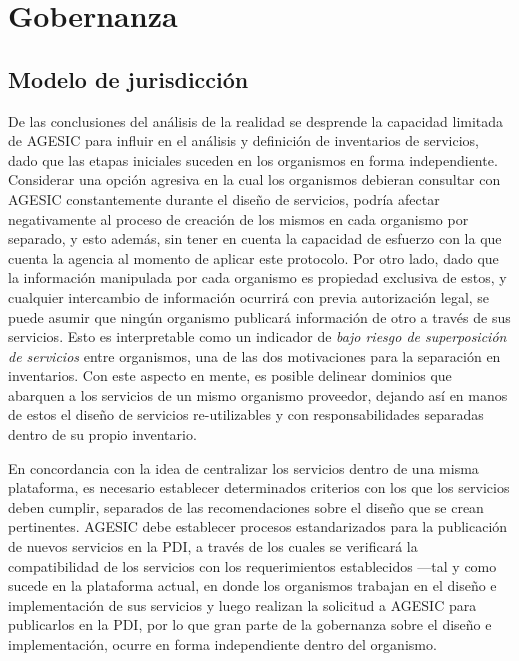 \section{Gobernanza}
  \label{Solucion:Gobernanza}

  \subsection{Modelo de jurisdicción}
    \label{Solucion:Gobernanza:ModeloJurisdiccion}
    De las conclusiones del análisis de la realidad se desprende la capacidad limitada de AGESIC para influir en el análisis y definición de inventarios de servicios, dado que las etapas iniciales suceden en los organismos en forma independiente. Considerar una opción agresiva en la cual los organismos debieran consultar con AGESIC constantemente durante el diseño de servicios, podría afectar negativamente al proceso de creación de los mismos en cada organismo por separado, y esto además, sin tener en cuenta la capacidad de esfuerzo con la que cuenta la agencia al momento de aplicar este protocolo. Por otro lado, dado que la información manipulada por cada organismo es propiedad exclusiva de estos, y cualquier intercambio de información ocurrirá con previa autorización legal, se puede asumir que ningún organismo publicará información de otro a través de sus servicios. Esto es interpretable como un indicador de \emph{bajo riesgo de superposición de servicios} entre organismos, una de las dos motivaciones para la separación en inventarios. Con este aspecto en mente, es posible delinear dominios que abarquen a los servicios de un mismo organismo proveedor, dejando así en manos de estos el diseño de servicios re-utilizables y con responsabilidades separadas dentro de su propio inventario.

    En concordancia con la idea de centralizar los servicios dentro de una misma plataforma, es necesario establecer determinados criterios con los que los servicios deben cumplir, separados de las recomendaciones sobre el diseño que se crean pertinentes. AGESIC debe establecer procesos estandarizados para la publicación de nuevos servicios en la PDI, a través de los cuales se verificará la compatibilidad de los servicios con los requerimientos establecidos —tal y como sucede en la plataforma actual, en donde los organismos trabajan en el diseño e implementación de sus servicios y luego realizan la solicitud a AGESIC para publicarlos en la PDI, por lo que gran parte de la gobernanza sobre el diseño e implementación, ocurre en forma independiente dentro del organismo.

